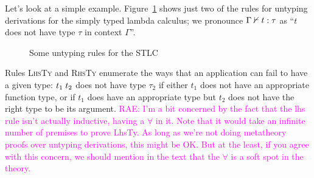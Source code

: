 \documentclass[sigplan, screen]{acmart}\settopmatter{printccs=false,printacmref=false}
\newcommand{\rae}[1]{\textcolor{magenta}{RAE: #1}}
\newcommand{\rae}[1]{}
\begin{document}
Let's look at a simple example.  Figure~\ref{fig:untyping-STLC}
shows just two of the rules for untyping derivations for the simply typed
lambda calculus; we pronounce ${\Gamma} \nvdash {t} : {\tau}$ as ``$t$ does
not have type $\tau$ in context $\Gamma$''.
\begin{figure}
  \caption{Some untyping rules for the STLC} \label{fig:untyping-STLC}
\end{figure}
Rules \textsc{LhsTy\frownie{}} and \textsc{RhsTy\frownie{}} enumerate
the ways that an application can fail to have a given type:
${t_1}\; {t_2}$ does not have type $\tau_2$ if either $t_1$ does not
have an appropriate function type, or if $t_1$ does have an
appropriate type but $t_2$ does not have the right type to be its
argument. \rae{I'm a bit concerned by the fact that the lhs rule isn't
actually inductive, having a $\forall$ in it. Note that it would take
an infinite number of premises to prove LhsTy. As long as we're not
doing metatheory proofs over untyping derivations, this might be OK.
But at the least, if you agree with this concern, we should mention
in the text that the $\forall$ is a soft spot in the theory.}
\end{document}
